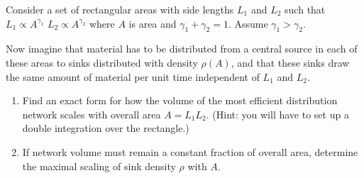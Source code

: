 Consider a set of rectangular areas with side lengths
$L_{1}$ and $L_{2}$ such that $L_{1} \propto A^{\gamma_{1}}$ 
$L_{2} \propto A^{\gamma_{2}}$ where $A$ is area and $\gamma_{1} + \gamma_{2}=1$.  
Assume $\gamma_{1} > \gamma_{2}$.

Now imagine that material has to be distributed from a central
source in each of these areas to sinks distributed with
density $\rho(A)$, and that these sinks draw the same amount
of material per unit time independent of $L_{1}$ and $L_{2}$.

\begin{enumerate}

\item
  Find an exact form for how the volume of the most efficient distribution
  network scales with overall area $A = L_{1} L_{2}$.  (Hint: you will
  have to set up a double integration over the rectangle.)

  
   \solutionstart


   \solutionend


\item
  If network volume must remain a constant fraction of overall
  area, determine the maximal scaling of sink density $\rho$ with $A$.

  
   \solutionstart


   \solutionend



  
\end{enumerate}


